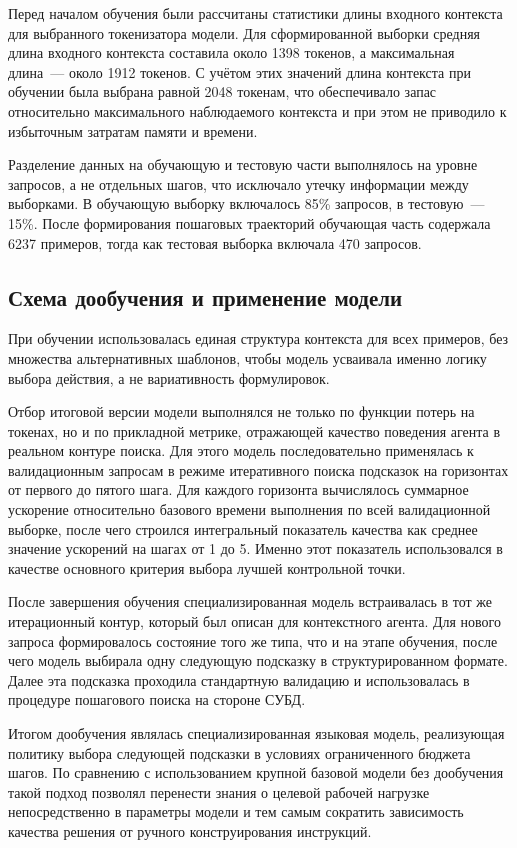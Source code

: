 Перед началом обучения были рассчитаны статистики длины входного контекста для выбранного токенизатора модели. Для сформированной выборки средняя длина входного контекста составила около 1398 токенов, а максимальная длина~--- около 1912 токенов. С учётом этих значений длина контекста при обучении была выбрана равной 2048 токенам, что обеспечивало запас относительно максимального наблюдаемого контекста и при этом не приводило к избыточным затратам памяти и времени.

Разделение данных на обучающую и тестовую части выполнялось на уровне запросов, а не отдельных шагов, что исключало утечку информации между выборками. В обучающую выборку включалось 85\% запросов, в тестовую~--- 15\%. После формирования пошаговых траекторий обучающая часть содержала 6237 примеров, тогда как тестовая выборка включала 470 запросов.

\subsection{Схема дообучения и применение модели}\label{subsec:ch4_finetuned_training}
При обучении использовалась единая структура контекста для всех примеров, без множества альтернативных шаблонов, чтобы модель усваивала именно логику выбора действия, а не вариативность формулировок.

Отбор итоговой версии модели выполнялся не только по функции потерь на токенах, но и по прикладной метрике, отражающей качество поведения агента в реальном контуре поиска. Для этого модель последовательно применялась к валидационным запросам в режиме итеративного поиска подсказок на горизонтах от первого до пятого шага. Для каждого горизонта вычислялось суммарное ускорение относительно базового времени выполнения по всей валидационной выборке, после чего строился интегральный показатель качества как среднее значение ускорений на шагах от 1 до 5. Именно этот показатель использовался в качестве основного критерия выбора лучшей контрольной точки.

После завершения обучения специализированная модель встраивалась в тот же итерационный контур, который был описан для контекстного агента. Для нового запроса формировалось состояние того же типа, что и на этапе обучения, после чего модель выбирала одну следующую подсказку в структурированном формате. Далее эта подсказка проходила стандартную валидацию и использовалась в процедуре пошагового поиска на стороне СУБД.

Итогом дообучения являлась специализированная языковая модель, реализующая политику выбора следующей подсказки в условиях ограниченного бюджета шагов. По сравнению с использованием крупной базовой модели без дообучения такой подход позволял перенести знания о целевой рабочей нагрузке непосредственно в параметры модели и тем самым сократить зависимость качества решения от ручного конструирования инструкций.


